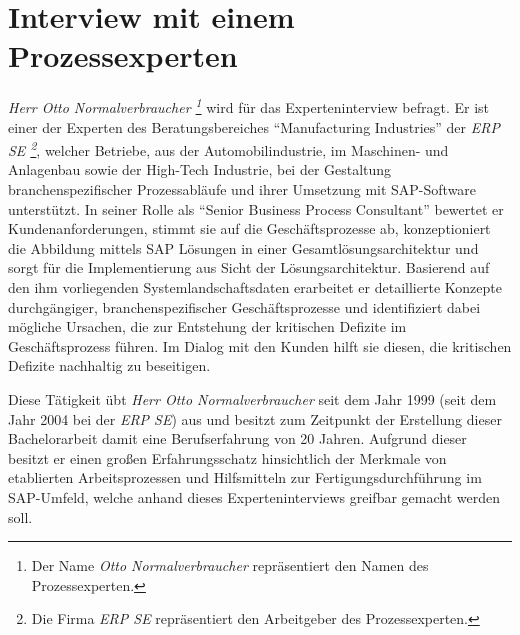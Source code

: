 \tocless\section{Interview mit einem Prozessexperten}

\textit{Herr Otto Normalverbraucher \footnote{Der Name \textit{Otto Normalverbraucher} repräsentiert den Namen des Prozessexperten.}} wird für das Experteninterview befragt.
Er ist einer der Experten des Beratungsbereiches \enquote{Manufacturing Industries} der \textit{ERP SE \footnote{Die Firma \textit{ERP SE} repräsentiert den Arbeitgeber des Prozessexperten.}}, welcher Betriebe, aus der Automobilindustrie, im Maschinen- und Anlagenbau sowie der High-Tech Industrie, bei der Gestaltung branchenspezifischer Prozessabläufe und ihrer Umsetzung mit SAP-Software unterstützt.
In seiner Rolle als \enquote{Senior Business Process Consultant} bewertet er Kundenanforderungen, stimmt sie auf die Geschäftsprozesse ab, konzeptioniert die Abbildung mittels SAP Lösungen in einer Gesamtlösungsarchitektur und sorgt für die Implementierung aus Sicht der Lösungsarchitektur.
Basierend auf den ihm vorliegenden Systemlandschaftsdaten erarbeitet er detaillierte Konzepte durchgängiger, branchenspezifischer Geschäftsprozesse und identifiziert dabei mögliche Ursachen, die zur Entstehung der kritischen Defizite im Geschäftsprozess führen.
Im Dialog mit den Kunden hilft sie diesen, die kritischen Defizite nachhaltig zu beseitigen. 
 
Diese Tätigkeit übt \textit{Herr Otto Normalverbraucher} seit dem Jahr 1999 (seit dem Jahr 2004 bei der \textit{ERP SE}) aus und besitzt zum Zeitpunkt der Erstellung dieser Bachelorarbeit damit eine Berufserfahrung von 20 Jahren.
Aufgrund dieser besitzt er einen großen Erfahrungsschatz hinsichtlich der Merkmale von etablierten Arbeitsprozessen und Hilfsmitteln zur Fertigungsdurchführung im SAP-Umfeld, welche anhand dieses Experteninterviews greifbar gemacht werden soll.

